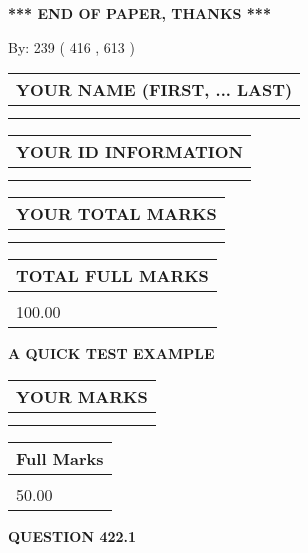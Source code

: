 \documentclass[12pt]{article}
\begin{document}
\vspace{1.0in} 
{\textbf{\large{ *** END OF PAPER, THANKS *** }}} 
   
   
\hspace{1.0in} By: 
 239 ( 416 ,  613 )
   
   
   
   
\newpage 
\setcounter{page}{ 
   422001 } 
   
   
   
   
\noindent\begin{tabular}{|l|}
\hline
YOUR NAME (FIRST, ... LAST)  \\
\hline
 \\ 
 \\ 
\hline
\end{tabular}
\hspace{0.05in} \begin{tabular}{|l|}
\hline
 YOUR   ID   INFORMATION  \\
\hline
 \\ 
 \\ 
\hline
\end{tabular}
   
   
\vspace{0.2in}\noindent\begin{tabular}{|l|}
\hline
YOUR TOTAL MARKS  \\
\hline
 \\ 
 \\ 
\hline
\end{tabular}
\hspace{0.05in} \begin{tabular}{|l|}
\hline
TOTAL FULL MARKS  \\
\hline
 \\ 
100.00 \\
\hline
\end{tabular}
   
   
 \vspace{0.2in}
{\LARGE {\textbf{ A QUICK TEST EXAMPLE}}}
   
   
  
\vspace{0.2in}
  
\noindent\begin{tabular}{|l|}
\hline
 YOUR MARKS  \\
\hline
 \\ 
 \\ 
\hline
\end{tabular}
\hspace{0.05in} \begin{tabular}{|l|}
\hline
 Full Marks  \\
\hline
 \\ 
50.00 \\
\hline
\end{tabular}
{\textbf{\Large{QUESTION
422.1 
}}}
  
\end{document}
